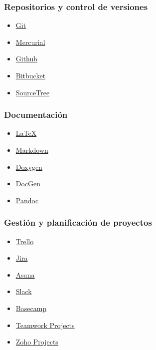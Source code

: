 \subsubsection{Repositorios y control de versiones}
\begin{multicols}{2}
\begin{itemize}
\item \href{https://git-scm.com/}{Git}
\item \href{https://www.mercurial-scm.org/}{Mercurial}
\item \href{https://github.com/}{Github}
\item \href{https://bitbucket.org/}{Bitbucket}
\item \href{https://www.sourcetreeapp.com/}{SourceTree}
\end{itemize}
\end{multicols}


\subsubsection{Documentación}
\begin{multicols}{2}
\begin{itemize}
\item \href{https://www.latex-project.org/}{\LaTeX}
\item \href{https://markdown.es/}{Markdown}
\item \href{http://www.stack.nl/\%7Edimitri/doxygen/index.html}{Doxygen}
\item \href{http://mtmacdonald.github.io/docgen/docs/index.html}{DocGen}
\item \href{http://pandoc.org/}{Pandoc}
\end{itemize}
\end{multicols}



\subsubsection{Gestión y planificación de proyectos}
\begin{multicols}{2}
\begin{itemize}
\item \href{https://trello.com/}{Trello}
\item \href{https://es.atlassian.com/software/jira}{Jira}
\item \href{https://asana.com/}{Asana}
\item \href{https://slack.com/}{Slack}
\item \href{https://basecamp.com/}{Basecamp}
\item \href{https://www.teamwork.com/project-management-software}{Teamwork Projects}
\item \href{https://www.zoho.com/projects/}{Zoho Projects}
\end{itemize}
\end{multicols}


